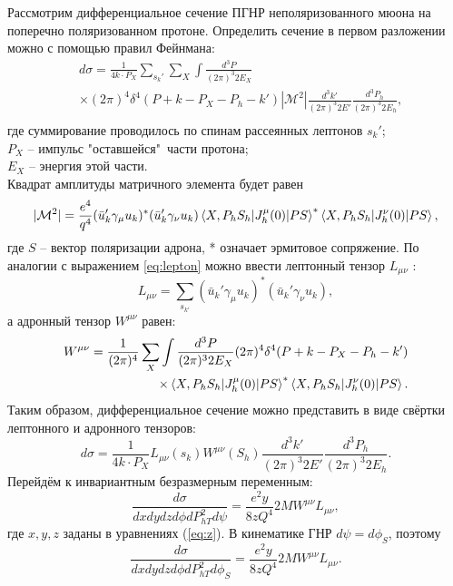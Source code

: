 \documentclass{extarticle}
\begin{document}
Рассмотрим дифференциальное сечение ПГНР неполяризованного мюона на поперечно поляризованном протоне. Определить сечение в первом разложении можно с помощью правил Фейнмана:
\begin{equation}
\begin{split}
	& d\sigma = \frac{1}{4k\cdot P_X} \sum_{s_k'} \sum_X \int \frac{d^3 P}{(2\pi)^3 2 E_X} \\
	& \times (2\pi)^4 \delta^4(P+k-P_X - P_h - k')|\mathcal{M}^2| \frac{d^3 k'}{(2\pi)^3 2E'}\frac{d^3 P_h}{(2\pi)^3 2E_h}, \\
\end{split}
\end{equation}
где суммирование проводилось по спинам рассеянных лептонов $s_k'$; \\ $P_X$ -- импульс "оставшейся"\ части протона; \\ $E_X$ -- энергия этой части. \\ Квадрат амплитуды матричного элемента будет равен
\begin{equation}
		|\mathcal{M}^2| = \frac{e^4}{q^4} (\bar{u}_k'\gamma_\mu u_k)^{*}(\bar{u}_k'\gamma_\nu u_k)  \braket{X, P_h S_h | J_h^\mu (0) | PS}^{*} \braket{X, P_h S_h | J_h^\nu (0) | PS},
\end{equation}
где $S$ -- вектор поляризации адрона, * означает эрмитовое сопряжение. По аналогии с выражением \ref{eq:lepton} можно ввести лептонный тензор $L_{\mu \nu}$ \cite{Barone_2002}:
\begin{equation}
	L_{\mu \nu} = \sum_{s_{k'}} (\bar{u}_k'\gamma_\mu u_k)^{*}(\bar{u}_k'\gamma_\nu u_k),
\end{equation}
а адронный тензор $W^{\mu \nu}$ равен:
\begin{equation}
	\begin{split}
		W^{\mu \nu} = \frac{1}{(2\pi)^4} \sum_X \int \frac{d^3 P}{(2\pi)^3 2 E_X} (2\pi)^4 \delta^4(P+k-P_X - P_h - k') \\
		\times \braket{X, P_h S_h | J_h^\mu (0) | PS}^{*} \braket{X, P_h S_h | J_h^\nu (0) | PS}.
	\end{split}
\end{equation}
Таким образом, дифференциальное сечение можно представить в виде свёртки лептонного и адронного тензоров:
\begin{equation}
	d\sigma = \frac{1}{4k\cdot P_X} L_{\mu\nu}(s_k) W^{\mu \nu}(S_h) \frac{d^3 k'}{(2\pi)^3 2E'}\frac{d^3 P_h}{(2\pi)^3 2E_h}.
\end{equation}
Перейдём к инвариантным безразмерным переменным:
\begin{equation}
	\frac{d\sigma}{dxdydzd\phi dP^2_{hT}d\psi} = \frac{e^2 y}{8zQ^4}2MW^{\mu\nu}L_{\mu\nu},
\end{equation}
где $x,y,z$ заданы в уравнениях (\ref{eq:z}). В кинематике ГНР $d\psi = d\phi_S$, поэтому
\begin{equation}
		\frac{d\sigma}{dxdydzd\phi dP^2_{hT}d\phi_S} = \frac{e^2 y}{8zQ^4}2MW^{\mu\nu}L_{\mu\nu}.
\end{equation}
\end{document}
